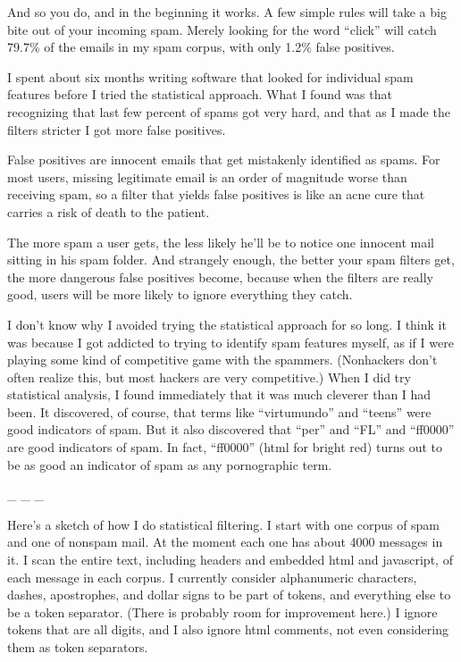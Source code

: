 \documentclass[12pt]{book}
\begin{document}
And so you do, and in the beginning it works. A few simple rules will
take a big bite out of your incoming spam. Merely looking for the word
``click'' will catch 79.7\% of the emails in my spam corpus, with only
1.2\% false positives.

I spent about six months writing software that looked for individual
spam features before I tried the statistical approach. What I found was
that recognizing that last few percent of spams got very hard, and that
as I made the filters stricter I got more false positives.

False positives are innocent emails that get mistakenly identified as
spams. For most users, missing legitimate email is an order of magnitude
worse than receiving spam, so a filter that yields false positives is
like an acne cure that carries a risk of death to the patient.

The more spam a user gets, the less likely he'll be to notice one
innocent mail sitting in his spam folder. And strangely enough, the
better your spam filters get, the more dangerous false positives become,
because when the filters are really good, users will be more likely to
ignore everything they catch.

I don't know why I avoided trying the statistical approach for so long.
I think it was because I got addicted to trying to identify spam
features myself, as if I were playing some kind of competitive game with
the spammers. (Nonhackers don't often realize this, but most hackers are
very competitive.) When I did try statistical analysis, I found
immediately that it was much cleverer than I had been. It discovered, of
course, that terms like ``virtumundo'' and ``teens'' were good
indicators of spam. But it also discovered that ``per'' and ``FL'' and
``ff0000'' are good indicators of spam. In fact, ``ff0000'' (html for
bright red) turns out to be as good an indicator of spam as any
pornographic term.

\_ \_ \_

Here's a sketch of how I do statistical filtering. I start with one
corpus of spam and one of nonspam mail. At the moment each one has about
4000 messages in it. I scan the entire text, including headers and
embedded html and javascript, of each message in each corpus. I
currently consider alphanumeric characters, dashes, apostrophes, and
dollar signs to be part of tokens, and everything else to be a token
separator. (There is probably room for improvement here.) I ignore
tokens that are all digits, and I also ignore html comments, not even
considering them as token separators.
\end{document}
